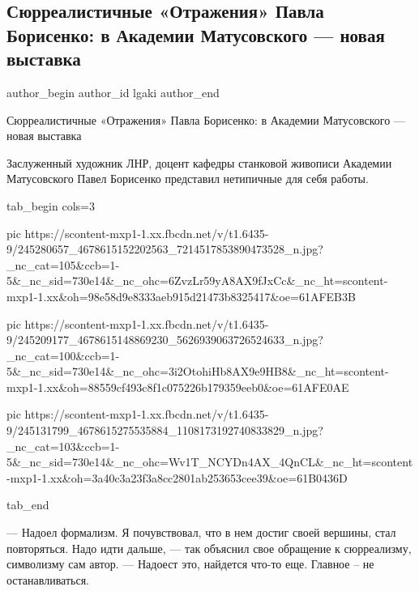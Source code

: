  
 
 
 
 
 
\subsection{Сюрреалистичные «Отражения» Павла Борисенко: в Академии Матусовского — новая выставка}
\label{sec:11_10_2021.fb.lgaki.1.lgaki_vystavka_borisenko}
 
\ifcmt
 author_begin
   author_id lgaki
 author_end
\fi

Сюрреалистичные «Отражения» Павла Борисенко: в Академии Матусовского — новая
выставка

Заслуженный художник ЛНР, доцент кафедры станковой живописи Академии
Матусовского Павел Борисенко представил нетипичные для себя работы.

\ifcmt
  tab_begin cols=3

     pic https://scontent-mxp1-1.xx.fbcdn.net/v/t1.6435-9/245280657_4678615152202563_7214517853890473528_n.jpg?_nc_cat=105&ccb=1-5&_nc_sid=730e14&_nc_ohc=6ZvzLr59yA8AX9fJxCc&_nc_ht=scontent-mxp1-1.xx&oh=98e58d9e8333aeb915d21473b8325417&oe=61AFEB3B

     pic https://scontent-mxp1-1.xx.fbcdn.net/v/t1.6435-9/245209177_4678615148869230_5626939063726524633_n.jpg?_nc_cat=100&ccb=1-5&_nc_sid=730e14&_nc_ohc=3i2OtohiHb8AX9e9HB8&_nc_ht=scontent-mxp1-1.xx&oh=88559cf493c8f1c075226b179359eeb0&oe=61AFE0AE

     pic https://scontent-mxp1-1.xx.fbcdn.net/v/t1.6435-9/245131799_4678615275535884_1108173192740833829_n.jpg?_nc_cat=103&ccb=1-5&_nc_sid=730e14&_nc_ohc=Wv1T_NCYDn4AX_4QnCL&_nc_ht=scontent-mxp1-1.xx&oh=3a40c3a23f3a8cc2801ab253653cee39&oe=61B0436D


  tab_end
\fi

— Надоел формализм. Я почувствовал, что в нем достиг своей вершины, стал
повторяться. Надо идти дальше, — так объяснил свое обращение к сюрреализму,
символизму сам автор. — Надоест это, найдется что-то еще. Главное – не
останавливаться.


